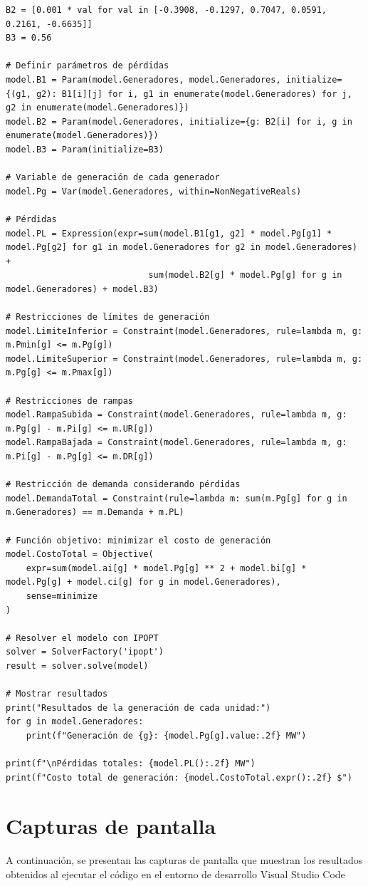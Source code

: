 \documentclass[11pt]{article}
\begin{document}
\begin{lstlisting}[style=mypython, caption={Modelo de Despacho Económico con Pyomo}]
B2 = [0.001 * val for val in [-0.3908, -0.1297, 0.7047, 0.0591, 0.2161, -0.6635]]
B3 = 0.56
    
# Definir parámetros de pérdidas
model.B1 = Param(model.Generadores, model.Generadores, initialize={(g1, g2): B1[i][j] for i, g1 in enumerate(model.Generadores) for j, g2 in enumerate(model.Generadores)})
model.B2 = Param(model.Generadores, initialize={g: B2[i] for i, g in enumerate(model.Generadores)})
model.B3 = Param(initialize=B3)
    
# Variable de generación de cada generador
model.Pg = Var(model.Generadores, within=NonNegativeReals)
    
# Pérdidas
model.PL = Expression(expr=sum(model.B1[g1, g2] * model.Pg[g1] * model.Pg[g2] for g1 in model.Generadores for g2 in model.Generadores) +
                            sum(model.B2[g] * model.Pg[g] for g in model.Generadores) + model.B3)
    
# Restricciones de límites de generación
model.LimiteInferior = Constraint(model.Generadores, rule=lambda m, g: m.Pmin[g] <= m.Pg[g])
model.LimiteSuperior = Constraint(model.Generadores, rule=lambda m, g: m.Pg[g] <= m.Pmax[g])
    
# Restricciones de rampas
model.RampaSubida = Constraint(model.Generadores, rule=lambda m, g: m.Pg[g] - m.Pi[g] <= m.UR[g])
model.RampaBajada = Constraint(model.Generadores, rule=lambda m, g: m.Pi[g] - m.Pg[g] <= m.DR[g])
    
# Restricción de demanda considerando pérdidas
model.DemandaTotal = Constraint(rule=lambda m: sum(m.Pg[g] for g in m.Generadores) == m.Demanda + m.PL)
    
# Función objetivo: minimizar el costo de generación
model.CostoTotal = Objective(
    expr=sum(model.ai[g] * model.Pg[g] ** 2 + model.bi[g] * model.Pg[g] + model.ci[g] for g in model.Generadores),
    sense=minimize
)
    
# Resolver el modelo con IPOPT
solver = SolverFactory('ipopt')
result = solver.solve(model)
    
# Mostrar resultados
print("Resultados de la generación de cada unidad:")
for g in model.Generadores:
    print(f"Generación de {g}: {model.Pg[g].value:.2f} MW")
    
print(f"\nPérdidas totales: {model.PL():.2f} MW")
print(f"Costo total de generación: {model.CostoTotal.expr():.2f} $")
\end{lstlisting}

\newpage
\section{Capturas de pantalla}
A continuación, se presentan las capturas de pantalla que muestran los resultados obtenidos al ejecutar el código en el entorno de desarrollo Visual Studio Code
\end{document}
